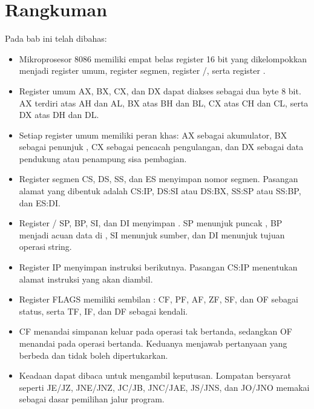 \section{Rangkuman}
\label{sec:rangkuman-bab5}

Pada bab ini telah dibahas:

\begin{itemize}
    \item Mikroprosesor 8086 memiliki empat belas register 16 bit
          yang dikelompokkan menjadi register umum, register segmen,
          register /, serta register
          .

    \item Register umum AX, BX, CX, dan DX dapat diakses sebagai dua
          byte 8 bit. AX terdiri atas AH dan AL, BX atas BH dan BL,
          CX atas CH dan CL, serta DX atas DH dan DL.

    \item Setiap register umum memiliki peran khas: AX sebagai
          akumulator, BX sebagai penunjuk , CX sebagai
          pencacah pengulangan, dan DX sebagai data pendukung atau
          penampung sisa pembagian.

    \item Register segmen CS, DS, SS, dan ES menyimpan nomor segmen.
          Pasangan alamat yang dibentuk adalah CS:IP, DS:SI atau
          DS:BX, SS:SP atau SS:BP, dan ES:DI.

    \item Register / SP, BP, SI, dan DI
          menyimpan . SP menunjuk puncak ,
          BP menjadi acuan data di , SI menunjuk sumber,
          dan DI menunjuk tujuan operasi string.

    \item Register IP menyimpan  instruksi berikutnya.
          Pasangan CS:IP menentukan alamat instruksi yang akan
          diambil.

    \item Register FLAGS memiliki sembilan : CF, PF, AF,
          ZF, SF, dan OF sebagai  status, serta TF, IF,
          dan DF sebagai  kendali.

    \item CF menandai simpanan keluar pada operasi tak bertanda,
          sedangkan OF menandai  pada operasi
          bertanda. Keduanya menjawab pertanyaan yang berbeda dan
          tidak boleh dipertukarkan.

    \item Keadaan  dapat dibaca untuk mengambil keputusan.
          Lompatan bersyarat seperti JE/JZ, JNE/JNZ, JC/JB, JNC/JAE,
          JS/JNS, dan JO/JNO memakai  sebagai dasar
          pemilihan jalur program.
\end{itemize}

